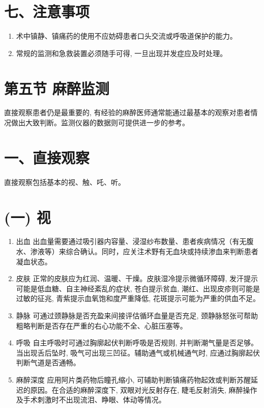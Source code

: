\documentclass[10pt]{article}
\begin{document}
\section*{七、注意事项}
\begin{enumerate}
  \item 术中镇静、镇痛药的使用不应妨碍患者口头交流或呼吸道保护的能力。

  \item 常规的监测和急救装置必须随手可得, 一旦出现并发症应及时处理。

\end{enumerate}

\section*{第五节 麻醉监测}
直接观察患者仍是最重要的, 有经验的麻醉医师通常能通过最基本的观察对患者情况做出大致判断。监测仪器的数据则可提供进一步的参考。

\section*{一、直接观察}
直接观察包括基本的视、触、吒、听。

\section*{(一) 视}
\begin{enumerate}
  \item 出血 出血量需要通过吸引器内容量、浸湿纱布数量、患者疾病情况（有无腹水、渗液等）来综合确认。同时，应关注术野有无血块或持续渗血来判断患者凝血状态。

  \item 皮肤 正常的皮肤应为红润、温暖、干燥。皮肤湿冷提示微循环障碍, 发汗提示可能是低血糖、自主神经紊乱的症状, 苍白提示贫血, 潮红、出现皮疹则可能是过敏的征兆, 青紫提示血氧饱和度严重降低, 花斑提示可能为严重的供血不足。

  \item 静脉 可通过颈静脉是否充盈来间接评估循环血量是否充足, 颈静脉怒张可帮助粗略判断是否存在严重的右心功能不全、心脏压塞等。

  \item 呼吸 自主呼吸时可通过胸廓起伏判断呼吸是否规则, 并判断潮气量是否足够。当出现舌后坠时, 吸气可出现三凹征。辅助通气或机械通气时, 应通过胸廓起伏判断气道是否通畅。

  \item 麻醉深度 应用阿片类药物后瞳孔缩小, 可辅助判断镇痛药物起效或判断苏醒延迟的原因。在合适的麻醉深度下, 双眼对光反射存在, 睫毛反射消失, 麻醉操作及手术刺激时不出现流泪、睁眼、体动等情况。

\end{enumerate}
\end{document}
